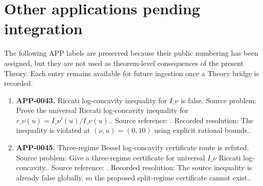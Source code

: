 \section{Other applications pending integration}
The following APP labels are preserved because their public numbering has been assigned, but they are not used as theorem-level consequences of the present Theory.  Each entry remains available for future ingestion once a Theory bridge is recorded.
\begin{enumerate}[leftmargin=*]
\item \textbf{APP-0043.} Riccati log-concavity inequality for \(I\_\nu\) is false.  Source problem: Prove the universal Riccati log-concavity inequality for \(r\_\nu(u)=I\_\nu'(u)/I\_\nu(u)\).. Source reference: \cite{app-app-0043-source}.  Recorded resolution: The inequality is violated at \((\nu,u)=(0,10)\) using explicit rational bounds..
\item \textbf{APP-0045.} Three-regime Bessel log-concavity certificate route is refuted.  Source problem: Give a three-regime certificate for universal \(I\_\nu\) Riccati log-concavity.. Source reference: \cite{app-app-0045-source}.  Recorded resolution: The source inequality is already false globally, so the proposed split-regime certificate cannot exist..
\end{enumerate}
